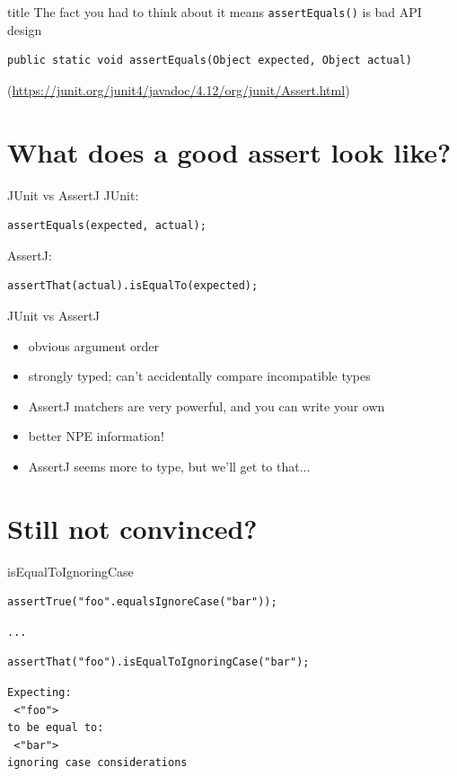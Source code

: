 \documentclass[xetex,12pt,aspectratio=169]{beamer}
\begin{document}
\begin{frame}[fragile]
\vfill
\begin{beamercolorbox}[sep=8pt,center,shadow=false,rounded=false]{title}
The fact you had to think about it means \texttt{assertEquals()} is bad API design\par%
\end{beamercolorbox}
\vfill
\pause
\begin{verbatim}
public static void assertEquals(Object expected, Object actual)
\end{verbatim}
({\footnotesize\url{https://junit.org/junit4/javadoc/4.12/org/junit/Assert.html}})
\end{frame}

\section{What does a good assert look like?}

\begin{frame}[fragile]{JUnit vs AssertJ}
JUnit:
\begin{verbatim}
assertEquals(expected, actual);
\end{verbatim}
\vfill
AssertJ:
\begin{verbatim}
assertThat(actual).isEqualTo(expected);
\end{verbatim}
\end{frame}

\begin{frame}{JUnit vs AssertJ}
\begin{itemize}
\item obvious argument order
\item strongly typed; can't accidentally compare incompatible types
\item AssertJ matchers are very powerful, and you can write your own
\item better NPE information!
\item AssertJ seems more to type, but we'll get to that...
\end{itemize}
\end{frame}

\section{Still not convinced?}

\begin{frame}[fragile]{isEqualToIgnoringCase}
\begin{verbatim}
assertTrue("foo".equalsIgnoreCase("bar"));
\end{verbatim}
\begin{verbatim}
...
\end{verbatim}
\vfill
\begin{verbatim}
assertThat("foo").isEqualToIgnoringCase("bar");
\end{verbatim}
\begin{verbatim}
Expecting:
 <"foo">
to be equal to:
 <"bar">
ignoring case considerations
\end{verbatim}
\end{frame}
\end{document}
